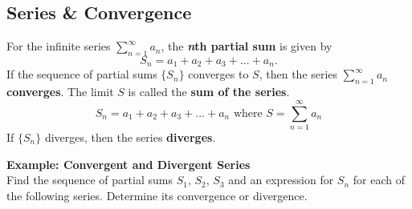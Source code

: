 \documentclass[addpoints, 12pt]{exam}
\begin{document}
\newpage
{}
\subsection*{Series \& Convergence}


\begin{tcolorbox}[title= DEFINITION OF CONVERGENT AND DIVERGENT SERIES,colframe=black,sharp corners,colback=white,colbacktitle=white,coltitle=black]

    For the infinite series $\displaystyle\sum_{n=1}^{\infty}a_n$, the \textbf{\textit{n}th partial sum} is given by
    \[S_n=a_1+a_2+a_3+...+a_n.\]
    If the sequence of partial sums $\{S_n\}$ converges to $S$, then the series $\displaystyle\sum_{n=1}^{\infty}a_n$ \textbf{converges}. The limit $S$ is called the \textbf{sum of the series}. 
    \[S_n=a_1+a_2+a_3+...+a_n \text{   where   }S=\sum_{n=1}^{\infty}a_n\]
    If $\{S_n\}$ diverges, then the series \textbf{diverges}.

\end{tcolorbox}
\vspace{.1in}

\noindent\textbf{Example: Convergent and Divergent Series}\\
Find the sequence of partial sums $S_1,\, S_2,\, S_3$ and an expression for $S_n$ for each of the following series. Determine its convergence or divergence.
\end{document}
